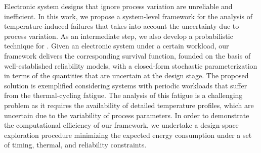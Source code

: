 Electronic system designs that ignore process variation are unreliable and inefficient.
In this work, we propose a system-level framework for the analysis of temperature-induced failures that takes into account the uncertainty due to process variation.
As an intermediate step, we also develop a probabilistic technique for \dssta.
Given an electronic system under a certain workload, our framework delivers the corresponding survival function, founded on the basis of well-established reliability models, with a closed-form stochastic parameterization in terms of the quantities that are uncertain at the design stage.
The proposed solution is exemplified considering systems with periodic workloads that suffer from the thermal-cycling fatigue.
The analysis of this fatigue is a challenging problem as it requires the availability of detailed temperature profiles, which are uncertain due to the variability of process parameters.
In order to demonstrate the computational efficiency of our framework, we undertake a design-space exploration procedure minimizing the expected energy consumption under a set of timing, thermal, and reliability constraints.
